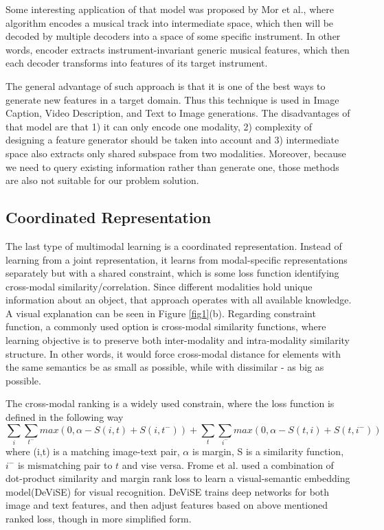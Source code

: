 \documentclass[runningheads]{llncs}
\begin{document}
Some interesting application of that model was proposed by Mor et al.\cite{ref_music_decoder}, where algorithm encodes a musical track into intermediate space, which then will be decoded by multiple decoders into a space of some specific instrument. In other words, encoder extracts instrument-invariant generic musical features, which then each decoder transforms into features of its target instrument.

The general advantage of such approach is that it is one of the best ways to generate new features in a target domain. Thus this technique is used in Image Caption\cite{ref_image_caption}, Video Description\cite{ref_video_description}, and Text to Image\cite{ref_text2image} generations. The disadvantages of that model are that 1) it can only encode one modality, 2) complexity of designing a feature generator should be taken into account\cite{ref_survey} and 3) intermediate space also extracts only shared subspace from two modalities. Moreover, because we need to query existing information rather than generate one, those methods are also not suitable for our problem solution.

\subsection{Coordinated Representation}
The last type of multimodal learning is a coordinated representation. Instead of learning from a joint representation, it learns from modal-specific representations separately but with a shared constraint, which is some loss function identifying cross-modal similarity/correlation. Since different modalities hold unique information about an object, that approach operates with all available knowledge. A visual explanation can be seen in Figure \ref{fig1}(b). Regarding constraint function, a commonly used option is cross-modal similarity functions, where learning objective is to preserve both inter-modality and intra-modality similarity structure. In other words, it would force cross-modal distance for elements with the same semantics be as small as possible, while with dissimilar - as big as possible. 

The cross-modal ranking is a widely used constrain, where the loss function is defined in the following way
\begin{equation} \label{eq_rank_loss}
\sum_i \sum_{t^-} max(0, \alpha - S(i, t) + S(i, t^-)) + \sum_t \sum_{i^-} max(0, \alpha - S(t, i) + S(t, i^-))
\end{equation}
where (i,t) is a matching image-text pair, $\alpha$ is margin, S is a similarity function, $i^-$ is mismatching pair to $t$ and vise versa. Frome et al.\cite{ref_devise} used a combination of dot-product similarity and margin rank loss to learn a visual-semantic embedding model(DeViSE) for visual recognition\cite{ref_survey}. DeViSE trains deep networks for both image and text features, and then adjust features based on above mentioned ranked loss, though in more simplified form.
\end{document}
